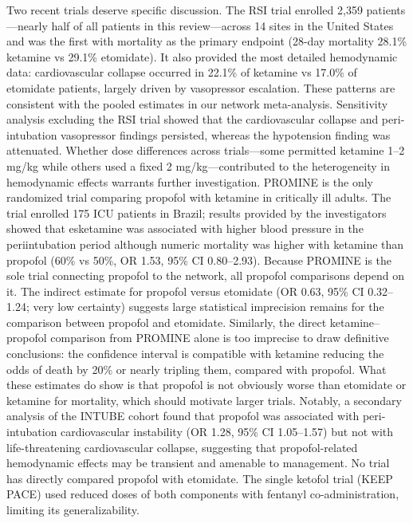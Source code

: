 \documentclass[11pt]{article}
\begin{document}
Two recent trials deserve specific discussion. The RSI trial\cite{casey2025} enrolled 2,359 patients---nearly half of all patients in this review---across 14 sites in the United States and was the first with mortality as the primary endpoint (28-day mortality 28.1\% ketamine vs 29.1\% etomidate). It also provided the most detailed hemodynamic data: cardiovascular collapse occurred in 22.1\% of ketamine vs 17.0\% of etomidate patients, largely driven by vasopressor escalation. These patterns are consistent with the pooled estimates in our network meta-analysis. Sensitivity analysis excluding the RSI trial showed that the cardiovascular collapse and peri-intubation vasopressor findings persisted, whereas the hypotension finding was attenuated. Whether dose differences across trials---some permitted ketamine 1--2 mg/kg while others used a fixed 2 mg/kg---contributed to the heterogeneity in hemodynamic effects warrants further investigation. PROMINE\cite{schmidt2025} is the only randomized trial comparing propofol with ketamine in critically ill adults. The trial enrolled 175 ICU patients in Brazil; results provided by the investigators showed that esketamine was associated with higher blood pressure in the periintubation period although numeric mortality was higher with ketamine than propofol (60\% vs 50\%, OR 1.53, 95\% CI 0.80--2.93). Because PROMINE is the sole trial connecting propofol to the network, all propofol comparisons depend on it. The indirect estimate for propofol versus etomidate (OR 0.63, 95\% CI 0.32--1.24; very low certainty) suggests large statistical imprecision remains for the comparison between propofol and etomidate. Similarly, the direct ketamine--propofol comparison from PROMINE alone is too imprecise to draw definitive conclusions: the confidence interval is compatible with ketamine reducing the odds of death by 20\% or nearly tripling them, compared with propofol. What these estimates do show is that propofol is not obviously worse than etomidate or ketamine for mortality, which should motivate larger trials. Notably, a secondary analysis of the INTUBE cohort found that propofol was associated with peri-intubation cardiovascular instability (OR 1.28, 95\% CI 1.05--1.57) but not with life-threatening cardiovascular collapse, suggesting that propofol-related hemodynamic effects may be transient and amenable to management.\cite{russotto2022} No trial has directly compared propofol with etomidate. The single ketofol trial (KEEP PACE\cite{smischney2019}) used reduced doses of both components with fentanyl co-administration, limiting its generalizability.
\end{document}
